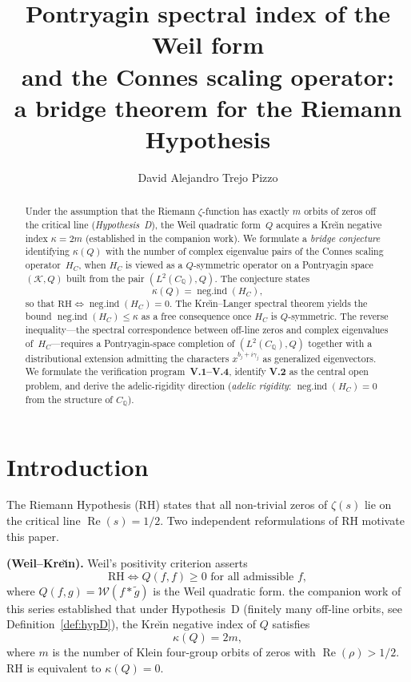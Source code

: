 \documentclass[11pt]{amsart}
\title[The Pontryagin-Index Bridge]{Pontryagin spectral index of the Weil form\\
  and the Connes scaling operator:\\
  a bridge theorem for the Riemann Hypothesis}
\author{David Alejandro Trejo Pizzo}
\renewcommand{\Re}{\operatorname{Re}}
\newcommand{\kap}{\kappa}
\newcommand{\negind}{\operatorname{neg.ind}}
\newcommand{\CQ}{C_{\mathbb{Q}}}
\newcommand{\Kcal}{\mathcal{K}}
\newcommand{\Wcal}{\mathcal{W}}
\begin{document}
\begin{abstract}
Under the assumption that the Riemann $\zeta$-function has exactly $m$ orbits of zeros
off the critical line (\emph{Hypothesis~D}), the Weil quadratic form~$Q$ acquires a
Kre\u{\i}n negative index $\kap = 2m$ (established in the companion work).
We formulate a \emph{bridge conjecture} identifying $\kap(Q)$ with the number of complex
eigenvalue pairs of the Connes scaling operator~$H_C$, when $H_C$ is viewed as a
$Q$-sym\-me\-tric operator on a Pontryagin space~$(\Kcal, Q)$ built from the pair
$(L^2(\CQ), Q)$.  The conjecture states
\[
  \kap(Q) = \negind(H_C),
\]
so that $\mathrm{RH} \iff \negind(H_C) = 0$.  The Kre\u{\i}n--Langer spectral theorem
yields the bound $\negind(H_C) \le \kap$ as a free consequence once $H_C$ is $Q$-symmetric.
The reverse inequality---the spectral correspondence between off-line zeros and complex
eigenvalues of~$H_C$---requires a Pontryagin-space completion of $(L^2(\CQ), Q)$ together
with a distributional extension admitting the characters $x^{b_j+i\gamma_j}$ as generalized
eigenvectors.  We formulate the verification program~\textbf{V.1--V.4}, identify
\textbf{V.2} as the central open problem, and derive the adelic-rigidity direction
(\emph{adelic rigidity}: $\negind(H_C)=0$ from the structure of $\CQ$).
\end{abstract}

\maketitle

\tableofcontents
\newpage

\section{Introduction}

The Riemann Hypothesis (RH) states that all non-trivial zeros of $\zeta(s)$ lie on the
critical line $\Re(s) = 1/2$.  Two independent reformulations of RH motivate this paper.

\medskip
\textbf{(Weil--Kre\u{\i}n).}  Weil's positivity criterion \cite{Weil52} asserts
\[
  \mathrm{RH} \iff Q(f,f) \ge 0 \text{ for all admissible } f,
\]
where $Q(f,g) = \Wcal(f*\tilde g)$ is the Weil quadratic form.  the companion work of this
series established that under Hypothesis~D (finitely many off-line orbits, see
Definition~\ref{def:hypD}), the Kre\u{\i}n negative index of $Q$ satisfies
\begin{equation}\label{eq:kappa-2m}
  \kap(Q) = 2m,
\end{equation}
where $m$ is the number of Klein four-group orbits of zeros with $\Re(\rho) > 1/2$.
RH is equivalent to $\kap(Q) = 0$.
\end{document}
